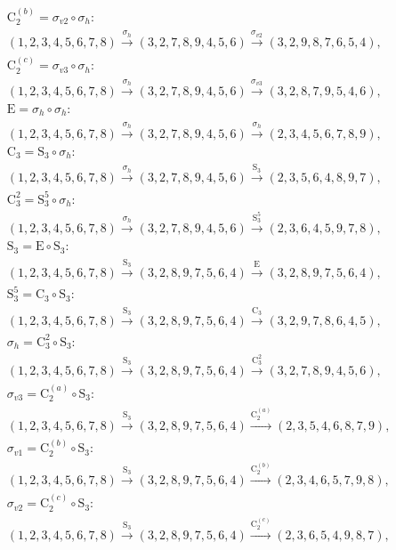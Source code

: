 \begin{align*}
& \mathrm{C}_{2}^{(b)} = \sigma_{v2} \circ \sigma_{h}:\; \\& (1,2,3,4,5,6,7,8) \xrightarrow{\sigma_{h}} (3,2,7,8,9,4,5,6) \xrightarrow{\sigma_{v2}} (3,2,9,8,7,6,5,4), \\
& \mathrm{C}_{2}^{(c)} = \sigma_{v3} \circ \sigma_{h}:\; \\& (1,2,3,4,5,6,7,8) \xrightarrow{\sigma_{h}} (3,2,7,8,9,4,5,6) \xrightarrow{\sigma_{v3}} (3,2,8,7,9,5,4,6), \\
& \mathrm{E} = \sigma_{h} \circ \sigma_{h}:\; \\& (1,2,3,4,5,6,7,8) \xrightarrow{\sigma_{h}} (3,2,7,8,9,4,5,6) \xrightarrow{\sigma_{h}} (2,3,4,5,6,7,8,9), \\
& \mathrm{C}_{3} = \mathrm{S}_{3} \circ \sigma_{h}:\; \\& (1,2,3,4,5,6,7,8) \xrightarrow{\sigma_{h}} (3,2,7,8,9,4,5,6) \xrightarrow{\mathrm{S}_{3}} (2,3,5,6,4,8,9,7), \\
& \mathrm{C}_{3}^{2} = \mathrm{S}_{3}^{5} \circ \sigma_{h}:\; \\& (1,2,3,4,5,6,7,8) \xrightarrow{\sigma_{h}} (3,2,7,8,9,4,5,6) \xrightarrow{\mathrm{S}_{3}^{5}} (2,3,6,4,5,9,7,8), \\
& \mathrm{S}_{3} = \mathrm{E} \circ \mathrm{S}_{3}:\; \\& (1,2,3,4,5,6,7,8) \xrightarrow{\mathrm{S}_{3}} (3,2,8,9,7,5,6,4) \xrightarrow{\mathrm{E}} (3,2,8,9,7,5,6,4), \\
& \mathrm{S}_{3}^{5} = \mathrm{C}_{3} \circ \mathrm{S}_{3}:\; \\& (1,2,3,4,5,6,7,8) \xrightarrow{\mathrm{S}_{3}} (3,2,8,9,7,5,6,4) \xrightarrow{\mathrm{C}_{3}} (3,2,9,7,8,6,4,5), \\
& \sigma_{h} = \mathrm{C}_{3}^{2} \circ \mathrm{S}_{3}:\; \\& (1,2,3,4,5,6,7,8) \xrightarrow{\mathrm{S}_{3}} (3,2,8,9,7,5,6,4) \xrightarrow{\mathrm{C}_{3}^{2}} (3,2,7,8,9,4,5,6), \\
& \sigma_{v3} = \mathrm{C}_{2}^{(a)} \circ \mathrm{S}_{3}:\; \\& (1,2,3,4,5,6,7,8) \xrightarrow{\mathrm{S}_{3}} (3,2,8,9,7,5,6,4) \xrightarrow{\mathrm{C}_{2}^{(a)}} (2,3,5,4,6,8,7,9), \\
& \sigma_{v1} = \mathrm{C}_{2}^{(b)} \circ \mathrm{S}_{3}:\; \\& (1,2,3,4,5,6,7,8) \xrightarrow{\mathrm{S}_{3}} (3,2,8,9,7,5,6,4) \xrightarrow{\mathrm{C}_{2}^{(b)}} (2,3,4,6,5,7,9,8), \\
& \sigma_{v2} = \mathrm{C}_{2}^{(c)} \circ \mathrm{S}_{3}:\; \\& (1,2,3,4,5,6,7,8) \xrightarrow{\mathrm{S}_{3}} (3,2,8,9,7,5,6,4) \xrightarrow{\mathrm{C}_{2}^{(c)}} (2,3,6,5,4,9,8,7), \\

\end{align*}
